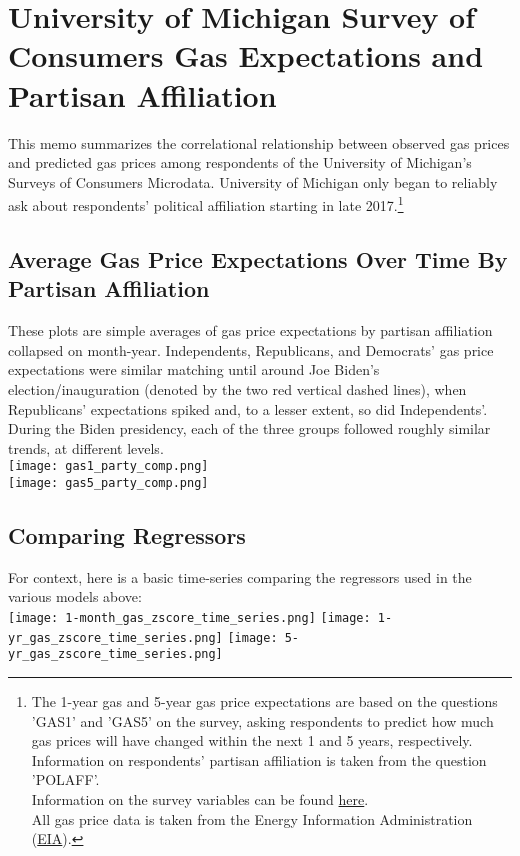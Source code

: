 \documentclass{article}
\begin{document}
\section{University of Michigan Survey of Consumers Gas Expectations and Partisan Affiliation}

This memo summarizes the correlational relationship between observed gas prices and predicted gas prices among respondents of the University of Michigan's Surveys of Consumers Microdata. University of Michigan only began to reliably ask about respondents' political affiliation starting in late 2017.\footnote{The 1-year gas and 5-year gas price expectations are based on the questions 'GAS1' and 'GAS5' on the survey, asking respondents to predict how much gas prices will have changed within the next 1 and 5 years, respectively. \\  Information on respondents' partisan affiliation is taken from the question 'POLAFF'. \\ Information on the survey variables can be found \href{https://sda.umsurvey.org/sca/Doc/sca.htm}{here}. \\ All gas price data is taken from the Energy Information Administration (\href{https://www.eia.gov/dnav/pet/hist/LeafHandler.ashx?n=pet&s=emm_epm0_pte_nus_dpg&f=m}{EIA}).}

\subsection{Average Gas Price Expectations Over Time By Partisan Affiliation}

These plots are simple averages of gas price expectations by partisan affiliation collapsed on month-year. Independents, Republicans, and Democrats' gas price expectations were similar matching until around Joe Biden's election/inauguration (denoted by the two red vertical dashed lines), when Republicans' expectations spiked and, to a lesser extent, so did Independents'. During the Biden presidency, each of the three groups followed roughly similar trends, at different levels. \\

\centering \texttt{[image: gas1\_party\_comp.png]} \\
\texttt{[image: gas5\_party\_comp.png]}

\raggedright \subsection{Comparing Regressors} 
For context, here is a basic time-series comparing the regressors used in the various models above: \\
\vspace{0.1in}
\centering \texttt{[image: 1-month\_gas\_zscore\_time\_series.png]} 
\texttt{[image: 1-yr\_gas\_zscore\_time\_series.png]} 
\texttt{[image: 5-yr\_gas\_zscore\_time\_series.png]} 
\end{document}
